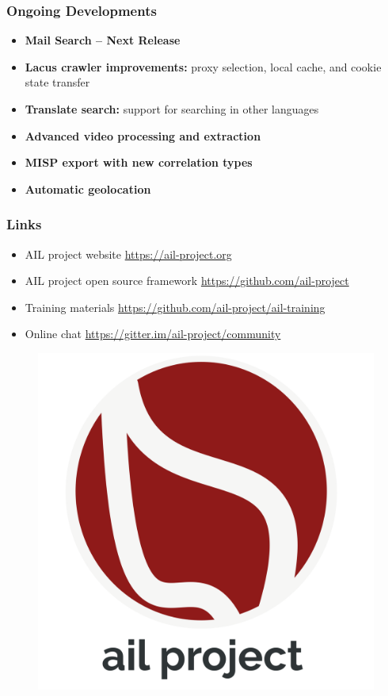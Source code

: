 \documentclass[10pt,aspectratio=169, colorlinks=true, linkcolor=circlBlue]{beamer}
\begin{document}
\begin{frame}
    \frametitle{Ongoing Developments}
    \begin{itemize}
        \item \textbf{Mail Search – Next Release}
        \item \textbf{Lacus crawler improvements:} proxy selection, local cache, and cookie state transfer
        \item \textbf{Translate search:} support for searching in other languages
        \item \textbf{Advanced video processing and extraction}
        \item \textbf{MISP export with new correlation types}
        \item \textbf{Automatic geolocation}
    \end{itemize}
\end{frame}

\begin{frame}
\frametitle{Links}
    \begin{itemize}
        \item AIL project website \url{https://ail-project.org}
        \item AIL project open source framework \url{https://github.com/ail-project}
        \item Training materials \url{https://github.com/ail-project/ail-training}
        \item Online chat \url{https://gitter.im/ail-project/community}
    \end{itemize}
    \begin{figure}
        \includegraphics[scale=0.1, angle=0]{images/ail-project.png}
    \end{figure}
\end{frame}
\end{document}
